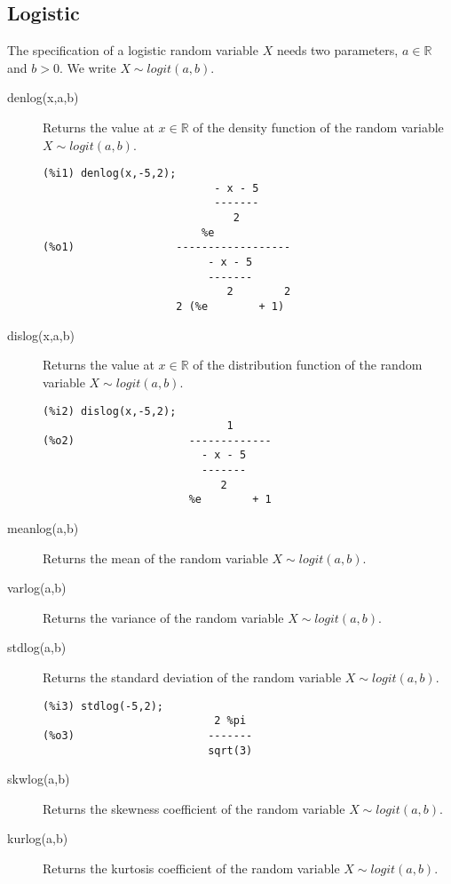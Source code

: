 \documentclass[12pt,a4paper]{article}
\newcommand{\R}{\mathbb{R}}
\begin{document}
\subsection{Logistic} 

The specification of a logistic random variable $X$ needs two parameters, $a \in \R$ and $b>0$. We write $X \sim logit(a,b)$.

\begin{description}

\item[denlog(x,a,b)] Returns the value at $x \in \R$ of the density function of the random variable $X \sim logit(a,b)$.

\begin{verbatim}
(%i1) denlog(x,-5,2);
                           - x - 5
                           -------
                              2
                         %e
(%o1)                ------------------
                          - x - 5
                          -------
                             2        2
                     2 (%e        + 1)
\end{verbatim}

\item[dislog(x,a,b)] Returns the value at $x \in \R$ of the distribution function of the random variable $X \sim logit(a,b)$.

\begin{verbatim}
(%i2) dislog(x,-5,2);
                             1
(%o2)                  -------------
                         - x - 5
                         -------
                            2
                       %e        + 1
\end{verbatim}

\item[meanlog(a,b)] Returns the mean of the random variable  $X \sim logit(a,b)$.

\item[varlog(a,b)] Returns the variance of the random variable  $X \sim logit(a,b)$.

\item[stdlog(a,b)] Returns the standard deviation of the random variable  $X \sim logit(a,b)$.

\begin{verbatim}
(%i3) stdlog(-5,2);
                           2 %pi
(%o3)                     -------
                          sqrt(3)
\end{verbatim}

\item[skwlog(a,b)] Returns the skewness coefficient of the random variable  $X \sim logit(a,b)$.

\item[kurlog(a,b)] Returns the kurtosis coefficient of the random variable  $X \sim logit(a,b)$.

\end{description}
\end{document}
